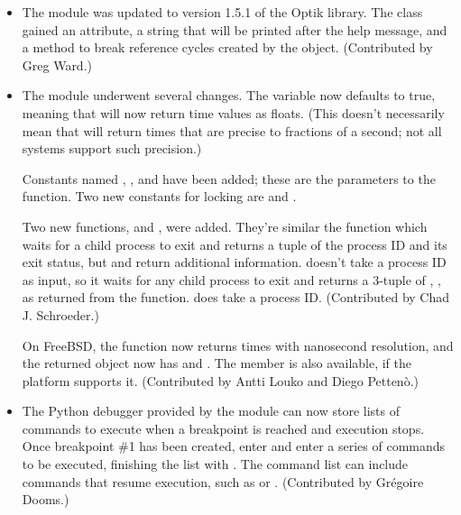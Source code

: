 \documentclass{howto}
\begin{document}
\begin{itemize}
\item The  module was updated to version 1.5.1 of the
Optik library.  The  class gained an
 attribute, a string that will be printed after the
help message, and a  method to break reference
cycles created by the object. (Contributed by Greg Ward.)

\item The  module underwent several changes.  The
 variable now defaults to true, meaning that
 will now return time values as floats.  (This
doesn't necessarily mean that  will return times
that are precise to fractions of a second; not all systems support
such precision.)

Constants named , , and
 have been added; these are the parameters to the
 function.  Two new constants for locking are
 and .

Two new functions,  and , were
added.  They're similar the  function which waits
for a child process to exit and returns a tuple of the process ID and
its exit status, but  and  return
additional information.   doesn't take a process ID
as input, so it waits for any child process to exit and returns a
3-tuple of , , 
as returned from the  function.
 does take a process ID.
(Contributed by Chad J. Schroeder.)

On FreeBSD, the  function now returns 
times with nanosecond resolution, and the returned object
now has  and .
The  member is also available, if the platform supports it.
(Contributed by Antti Louko and  Diego Petten\`o.)

\item The Python debugger provided by the  module
can now store lists of commands to execute when a breakpoint is
reached and execution stops.  Once breakpoint \#1 has been created,
enter  and enter a series of commands to be executed,
finishing the list with .  The command list can include
commands that resume execution, such as  or
.  (Contributed by Gr\'egoire Dooms.)


\end{itemize}
\end{document}
